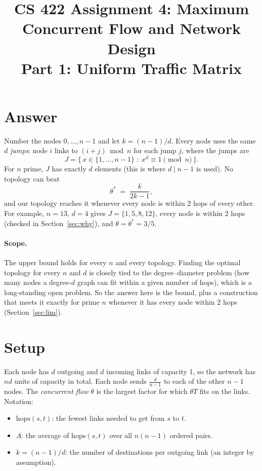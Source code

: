 \documentclass[11pt]{article}
\title{CS 422 Assignment 4: Maximum Concurrent Flow and Network Design\\[2pt]
\large Part 1: Uniform Traffic Matrix}
\author{}
\date{}
\theoremstyle{definition}
\begin{document}
\maketitle
\vspace{-3em}

\section*{Answer}

Number the nodes $0,\dots,n-1$ and let $k = (n-1)/d$. Every node uses the same $d$ \emph{jumps}: node $i$ links to
$(i+j) \bmod n$ for each jump $j$, where the jumps are
\[
J = \{\, x \in \{1,\dots,n-1\} \;:\; x^d \equiv 1 \pmod n \,\}.
\]
For $n$ prime, $J$ has exactly $d$ elements (this is where $d \mid n-1$ is used). No topology can beat
\[
\theta^* \;=\; \frac{k}{2k-1},
\]
and our topology reaches it whenever every node is within 2 hops of every other. For example, $n=13$, $d=4$ gives
$J=\{1,5,8,12\}$, every node is within 2 hops (checked in Section~\ref{sec:why}), and $\theta = \theta^* = 3/5$.

\paragraph{Scope.} The upper bound holds for every $n$ and every topology. Finding the optimal topology for every $n$
and $d$ is closely tied to the degree--diameter problem (how many nodes a degree-$d$ graph can fit within a given
number of hops), which is a long-standing open problem. So the answer here is the bound, plus a construction that
meets it exactly for prime $n$ whenever it has every node within 2 hops (Section~\ref{sec:lim}).

\section{Setup}

Each node has $d$ outgoing and $d$ incoming links of capacity 1, so the network has $nd$ units of capacity in total.
Each node sends $\frac{d}{n-1}$ to each of the other $n-1$ nodes. The \emph{concurrent flow} $\theta$ is the largest
factor for which $\theta T$ fits on the links. Notation:
\begin{itemize}
\item $\mathrm{hops}(s,t)$: the fewest links needed to get from $s$ to $t$.
\item $A$: the average of $\mathrm{hops}(s,t)$ over all $n(n-1)$ ordered pairs.
\item $k = (n-1)/d$: the number of destinations per outgoing link (an integer by assumption).
\end{itemize}
\end{document}
